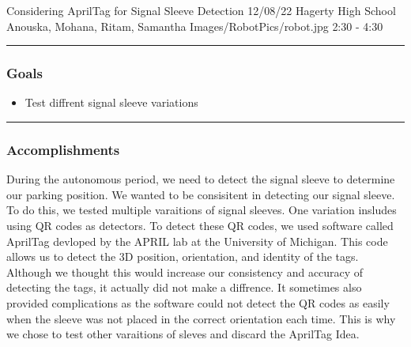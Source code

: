 \insertmeeting 
	{Considering AprilTag for Signal Sleeve Detection} 
	{12/08/22}
	{Hagerty High School}
	{Anouska, Mohana, Ritam, Samantha}
	{Images/RobotPics/robot.jpg}
	{2:30 - 4:30}
	
\noindent\hfil\rule{\textwidth}{.4pt}\hfil
\subsubsection*{Goals}
\begin{itemize}
    \item Test diffrent signal sleeve variations

\end{itemize} 

\noindent\hfil\rule{\textwidth}{.4pt}\hfil

\subsubsection*{Accomplishments}
During the autonomous period, we need to detect the signal sleeve to determine our parking position. We wanted to be consisitent in detecting our signal sleeve. To do this, we tested multiple varaitions of signal sleeves. One variation insludes using QR codes as detectors. To detect these QR codes, we used software called AprilTag devloped by the APRIL lab at the University of Michigan. This code allows us to detect the 3D position, orientation, and identity of the tags. Although we thought this would increase our consistency and accuracy of detecting the tags, it actually did not make a diffrence. It sometimes also provided complications as the software could not detect the QR codes as easily when the sleeve was not placed in the correct orientation each time. This is why we chose to test other varaitions of sleves and discard the AprilTag Idea. 


